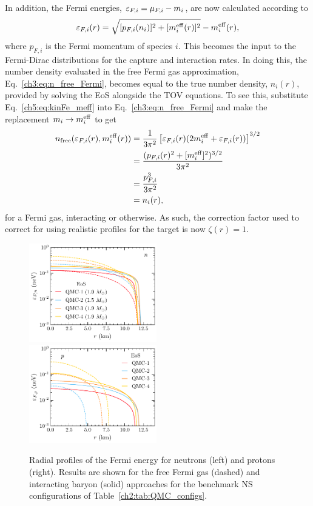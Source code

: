 In addition, the Fermi energies, $\varepsilon_{F,i} = \mu_{F,i} - m_i$, are now calculated according to 
\begin{equation}
   \varepsilon_{F,i}(r) = \sqrt{[p_{F,i}(n_i)]^2 + [m_i^{\rm eff}(r)]^2} - m_i^{\rm eff}(r),
   \label{ch5:eq:kinFe_meff}
\end{equation}
where $p_{F,i}$ is the Fermi momentum of species $i$. This becomes the input to the Fermi-Dirac distributions for the capture and interaction rates. In doing this, the number density evaluated in the free Fermi gas approximation, Eq.~\ref{ch3:eq:n_free_Fermi}, becomes equal to the true number density, $n_i(r)$, provided by solving the EoS alongside the TOV equations. To see this, substitute Eq.~\ref{ch5:eq:kinFe_meff} into Eq.~\ref{ch3:eq:n_free_Fermi} and make the replacement $m_i\rightarrow m_i^{\rm eff}$ to get
\begin{align}
   n_\mathrm{free}(\varepsilon_{F,i}(r), m_i^{\rm eff}(r)) & = \frac{1}{3\pi^2}\left[ \varepsilon_{F,i}(r)(2m_i^{\rm eff} + \varepsilon_{F,i}(r))\right]^{3/2}\\
   & = \frac{(p_{F,i}(r)^2 + [m_i^{\rm eff}]^2)^{3/2}}{3\pi^2}\\
   & = \frac{p_{F, i}^3}{3\pi^2}\\
   & = n_i(r),
\end{align}
for a Fermi gas, interacting or otherwise. 
As such, the correction factor used to correct for using realistic profiles for the target is now $\zeta(r) = 1$.


\begin{figure}[t!bp]
   \centering
\includegraphics[width=0.495\textwidth]{capture_3/muFn_meff_r_QMC.pdf}
\includegraphics[width=0.495\textwidth]{capture_3/muFp_meff_r_QMC.pdf}
   \caption{Radial profiles of the Fermi energy for neutrons (left) and protons (right). Results are shown for the free Fermi gas (dashed) and interacting baryon (solid) approaches for the benchmark NS configurations of Table~\ref{ch2:tab:QMC_configs}.
   }
   \label{ch5:fig:muradprofs}
\end{figure}

